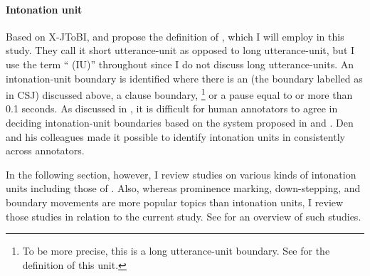 \paragraph{Intonation unit}

Based on X-JToBI,
 and  propose the definition of ,
which I will employ in this study.
They call it short utterance-unit as opposed to long utterance-unit,
but I use the term `` (IU)'' throughout
since I do not discuss long utterance-units.
An intonation-unit boundary is identified
where there is an  (the boundary labelled as  in CSJ) discussed above,
a clause boundary,%
	\footnote{
	To be more precise, this is a long utterance-unit boundary.
	See  for the definition of this unit.
	}
or
a pause equal to or more than 0.1 seconds.
As discussed in ,
it is difficult for human annotators to agree in deciding intonation-unit boundaries based on the system proposed in  and .
Den and his colleagues made it possible to identify intonation units in  consistently across annotators.

In the following section, however,
I review studies on various kinds of intonation units including those of .
Also, whereas prominence marking, down-stepping, and boundary  movements are more popular topics than intonation units,
I review those studies in relation to the current study.
See  for an overview of such studies.


%
%
%
%





